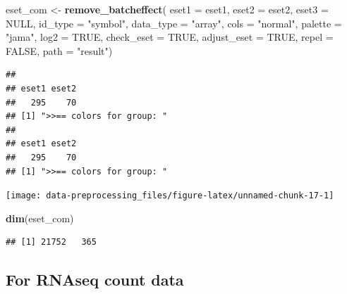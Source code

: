 \documentclass[
  12pt,
]{book}
\newenvironment{Shaded}{\begin{snugshade}}{\end{snugshade}}
\newcommand{\AttributeTok}[1]{\textcolor[rgb]{0.13,0.29,0.53}{#1}}
\newcommand{\ConstantTok}[1]{\textcolor[rgb]{0.56,0.35,0.01}{#1}}
\newcommand{\FunctionTok}[1]{\textcolor[rgb]{0.13,0.29,0.53}{\textbf{#1}}}
\newcommand{\NormalTok}[1]{#1}
\newcommand{\OtherTok}[1]{\textcolor[rgb]{0.56,0.35,0.01}{#1}}
\newcommand{\StringTok}[1]{\textcolor[rgb]{0.31,0.60,0.02}{#1}}
\begin{document}
\begin{Shaded}
\begin{Highlighting}[]
\NormalTok{eset\_com }\OtherTok{\textless{}{-}} \FunctionTok{remove\_batcheffect}\NormalTok{( }\AttributeTok{eset1       =}\NormalTok{ eset1,  }
                                \AttributeTok{eset2       =}\NormalTok{ eset2,   }
                                \AttributeTok{eset3       =} \ConstantTok{NULL}\NormalTok{,}
                                \AttributeTok{id\_type     =} \StringTok{"symbol"}\NormalTok{,}
                                \AttributeTok{data\_type   =} \StringTok{"array"}\NormalTok{, }
                                \AttributeTok{cols        =} \StringTok{"normal"}\NormalTok{, }
                                \AttributeTok{palette     =} \StringTok{"jama"}\NormalTok{, }
                                \AttributeTok{log2        =} \ConstantTok{TRUE}\NormalTok{, }
                                \AttributeTok{check\_eset  =} \ConstantTok{TRUE}\NormalTok{,}
                                \AttributeTok{adjust\_eset =} \ConstantTok{TRUE}\NormalTok{,}
                                \AttributeTok{repel       =} \ConstantTok{FALSE}\NormalTok{,}
                                \AttributeTok{path        =} \StringTok{"result"}\NormalTok{)}
\end{Highlighting}
\end{Shaded}

\begin{verbatim}
## 
## eset1 eset2 
##   295    70 
## [1] ">>== colors for group: "
## 
## eset1 eset2 
##   295    70 
## [1] ">>== colors for group: "
\end{verbatim}

\begin{center}\texttt{[image: data-preprocessing\_files/figure-latex/unnamed-chunk-17-1]} \end{center}

\begin{Shaded}
\begin{Highlighting}[]
\FunctionTok{dim}\NormalTok{(eset\_com)}
\end{Highlighting}
\end{Shaded}

\begin{verbatim}
## [1] 21752   365
\end{verbatim}

\hypertarget{for-rnaseq-count-data}{%
\subsection{For RNAseq count data}\label{for-rnaseq-count-data}}
\end{document}
